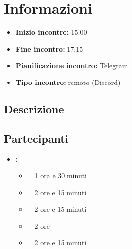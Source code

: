 \section{Informazioni}
\begin{itemize}
	\item \textbf{Inizio incontro:} 15:00
	\item \textbf{Fine incontro:} 17:15
	\item \textbf{Pianificazione incontro:} Telegram
	\item \textbf{Tipo incontro:} remoto (Discord)
\end{itemize}

\subsection{Descrizione}
\DocDescription

\subsection{Partecipanti}

\begin{itemize}
	\item \textbf{\GroupName:}
	\begin{itemize}
		\item \tommaso \ \rightarrow\ 1 ora e 30 minuti
		\item \marco \ \rightarrow\ 2 ore e 15 minuti
		\item \riccardo \ \rightarrow\ 2 ore e 15 minuti
		\item \mattia \ \rightarrow\ 2 ore
		\item \raul \ \rightarrow\ 2 ore e 15 minuti
	\end{itemize}
\end{itemize}

\clearpage